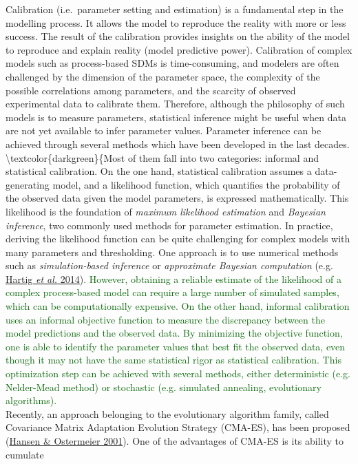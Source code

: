 \documentclass[11pt,]{article}
\begin{document}
Calibration (i.e.~parameter setting and estimation) is a fundamental
step in the modelling process. It allows the model to reproduce the
reality with more or less success. The result of the calibration
provides insights on the ability of the model to reproduce and explain
reality (model predictive power). Calibration of complex models such as
process-based SDMs is time-consuming, and modelers are often challenged
by the dimension of the parameter space, the complexity of the possible
correlations among parameters, and the scarcity of observed experimental
data to calibrate them. Therefore, although the philosophy of such
models is to measure parameters, statistical inference might be useful
when data are not yet available to infer parameter values. Parameter
inference can be achieved through several methods which have been
developed in the last decades.
\textbackslash textcolor\{darkgreen\}\{Most of them fall into two
categories: informal and statistical calibration. On the one hand,
statistical calibration assumes a data-generating model, and a
likelihood function, which quantifies the probability of the observed
data given the model parameters, is expressed mathematically. This
likelihood is the foundation of \emph{maximum likelihood estimation} and
\emph{Bayesian inference}, two commonly used methods for parameter
estimation. In practice, deriving the likelihood function can be quite
challenging for complex models with many parameters and thresholding.
One approach is to use numerical methods such as
\emph{simulation-based inference} or
\emph{approximate Bayesian computation} (e.g.
\protect\hyperlink{ref-Hartig2014}{Hartig \emph{et al.}
2014})\textcolor{darkgreen}{. However, obtaining a reliable estimate of the likelihood of a complex process-based model can require a large number of simulated samples, which can be computationally expensive. On the other hand, informal calibration uses an informal objective function to measure the discrepancy between the model predictions and the observed data. By minimizing the objective function, one is able to identify the parameter values that best fit the observed data, even though it may not have the same statistical rigor as statistical calibration. This optimization step can be achieved with several methods, either deterministic (e.g. Nelder-Mead method) or stochastic (e.g. simulated annealing, evolutionary algorithms).}\\
Recently, an approach belonging to the evolutionary algorithm family,
called Covariance Matrix Adaptation Evolution Strategy (CMA-ES), has
been proposed (\protect\hyperlink{ref-Hansen2001}{Hansen \& Ostermeier
2001}). One of the advantages of CMA-ES is its ability to cumulate
\end{document}

